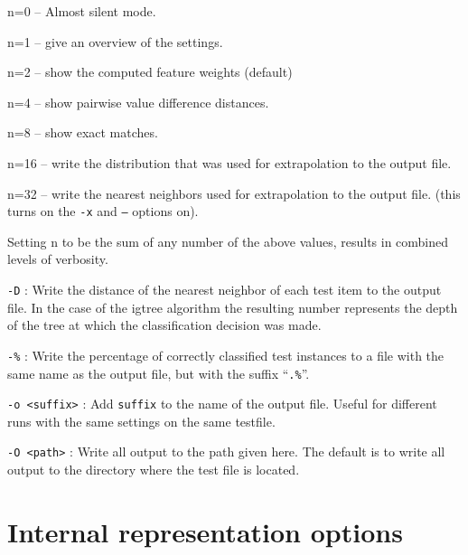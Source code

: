 \documentclass{report}
\begin{document}
\begin{description}
	\begin{description}
	\item n=0 -- Almost silent mode.
	\item n=1 -- give an overview of the settings.
	\item n=2 -- show the computed feature weights (default)
	\item n=4 -- show pairwise value difference distances.
	\item n=8 -- show exact matches.
	\item n=16 -- write the distribution that was used for extrapolation to the output file.
	\item n=32 -- write the nearest neighbors used for extrapolation to the output file. (this turns on the {\tt -x} and {\tt --} options on).
	\item Setting n to be the sum of any number of the above
values, results in combined levels of verbosity.
	\end{description}

\item {\tt -D} : Write the distance of the nearest neighbor of each
test item to the output file. In the case of the {\sc igtree}
algorithm the resulting number represents the depth of the tree at
which the classification decision was made.

\item {\tt -\%} : Write the percentage of correctly classified test
                 instances to a file with the same name as the output
                 file, but with the suffix ``{\tt .\%}''.

\item {\tt -o <suffix>} : Add {\tt suffix} to the name of the output
file. Useful for different runs with the same settings on the same
testfile.

\item {\tt -O <path>} : Write all output to the path given here. The
default is to write all output to the directory where the test file
is located.

\end{description}

\section{Internal representation options}
\end{document}
